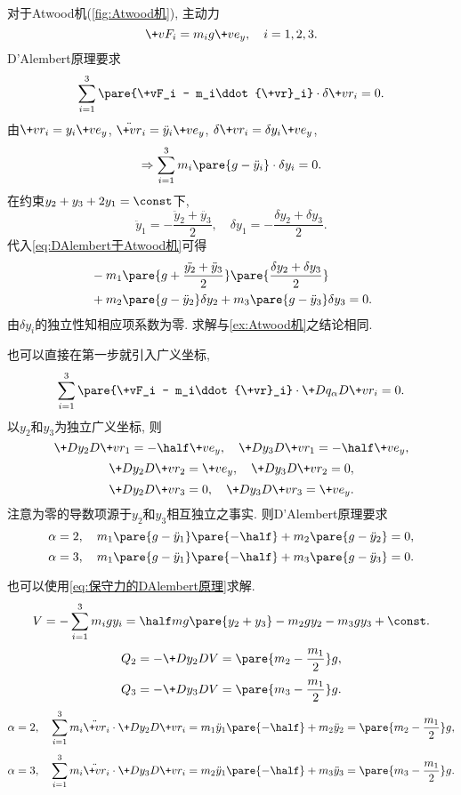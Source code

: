 \documentclass[../LectureNotes.tex]{subfiles}
\begin{document}
\begin{sample}
    \begin{ex}
        对于Atwood机(\cref{fig:Atwood机}), 主动力
        \[ \+vF_i = m_i g\+ve_y,\quad i = 1,2,3. \]
        D'Alembert原理要求
        \[ \sum_{i=1}^3 \pare{\+vF_i - m_i\ddot{\+vr}_i}\cdot \delta\+vr_i = 0. \]
        由$\+vr_i = y_i\+ve_y$, $\ddot{\+vr}_i = \ddot{y}_i\+ve_y$, $\delta \+vr_i = \delta y_i \+ve_y$,
        \begin{equation}
            \label{eq:DAlembert于Atwood机}
            \Rightarrow \sum_{i=1}^3 m_i\pare{g  - \ddot{y}_i}\cdot\delta y_i = 0. 
        \end{equation}
        在约束$y_2+y_3 + 2y_1 = \const$下,
        \[ \ddot{y}_1 = -\frac{\ddot{y}_2 + \ddot{y_3}}{2},\quad \delta y_1 = -\frac{\delta y_2 + \delta y_3}{2}. \]
        代入\eqref{eq:DAlembert于Atwood机}可得
        \begin{align*}
            &-m_1\pare{g+\frac{\ddot{y_2} + \ddot{y}_3}{2}}\pare{\frac{\delta y_2 + \delta y_3}{2}} \\
            &+ m_2\pare{g - \ddot{y}_2}\delta y_2 + m_3\pare{g - \ddot{y}_3}\delta y_3 = 0.
        \end{align*}
        由$\delta y_i$的独立性知相应项系数为零. 求解与\cref{ex:Atwood机}之结论相同.
    \end{ex}
    \begin{ex}
        也可以直接在第一步就引入广义坐标,
        \[ \sum_{i=1}^3 \pare{\+vF_i - m_i\ddot{\+vr}_i}\cdot\+D{q_\alpha}D{\+vr_i} = 0. \]
        以$y_2$和$y_3$为独立广义坐标, 则
        \[ \+D{y_2}D{\+vr_1} = -\half\+ve_y,\quad \+D{y_3}D{\+vr_1} = -\half\+ve_y, \]
        \[ \+D{y_2}D{\+vr_2} = \+ve_y,\quad \+D{y_3}D{\+vr_2} = 0, \]
        \[ \+D{y_2}D{\+vr_3} = 0,\quad \+D{y_3}D{\+vr_3} = \+ve_y. \]
        注意为零的导数项源于$y_2$和$y_3$相互独立之事实. 则D'Alembert原理要求
        \[ \alpha=2,\quad m_1\pare{g-\ddot{y}_1}\pare{-\half} + m_2\pare{g-\ddot{y}_2} = 0, \]
        \[ \alpha=3,\quad m_1\pare{g-\ddot{y}_1}\pare{-\half} + m_3\pare{g-\ddot{y}_3} = 0. \]
    \end{ex}
    \begin{ex}
        也可以使用\eqref{eq:保守力的DAlembert原理}求解.
        \[ V = -\sum_{i=1}^3 m_i g y_i = \half mg\pare{y_2+y_3} - m_2 gy_2 - m_3gy_3 + \const. \]
        \[ Q_2 = -\+D{y_2}D{V} = \pare{m_2 - \frac{m_1}{2}}g, \]
        \[ Q_3 = -\+D{y_3}D{V} = \pare{m_3 - \frac{m_1}{2}}g. \]
        \[ \alpha=2,\quad \sum_{i=1}^3 m_i\ddot{\+vr}_i\cdot\+D{y_2}D{\+vr_i} = m_1 \ddot{y}_1 \pare{-\half} + m_2\ddot{y}_2 = \pare{m_2 - \frac{m_1}{2}}g, \]
        \[ \alpha=3,\quad \sum_{i=1}^3 m_i\ddot{\+vr}_i\cdot\+D{y_3}D{\+vr_i} = m_2 \ddot{y}_1 \pare{-\half} + m_3\ddot{y}_3 = \pare{m_3 - \frac{m_1}{2}}g. \]
    \end{ex}
\end{sample}
\end{document}
